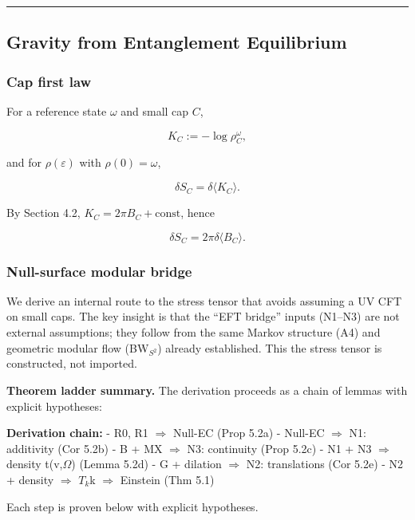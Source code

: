 \documentclass[11pt,a4paper]{article}
\theoremstyle{remark}
\begin{document}
\begin{center}\rule{0.5\linewidth}{0.5pt}\end{center}

\subsection{Gravity from Entanglement Equilibrium}\label{gravity-from-entanglement-equilibrium}

\subsubsection{Cap first law}\label{cap-first-law}

For a reference state \(\omega\) and small cap \(C\),

\[
K_C := -\log \rho_C^{\omega},
\]

and for \(\rho(\varepsilon)\) with \(\rho(0)=\omega\),

\[
\delta S_C = \delta \langle K_C \rangle.
\]

By Section 4.2, \(K_C = 2\pi B_C + \text{const}\), hence

\[
\delta S_C = 2 \pi \delta \langle B_C \rangle.
\]

\subsubsection{Null-surface modular bridge}\label{null-surface-modular-bridge}

We derive an internal route to the stress tensor that avoids assuming a UV
CFT on small caps. The key insight is that the ``EFT bridge'' inputs (N1--N3)
are not external assumptions; they follow from the same Markov structure
(A4) and geometric modular flow (BW\(_{S^2}\)) already established. This
the stress tensor is constructed, not imported.

\textbf{Theorem ladder summary.} The derivation proceeds as a chain of lemmas with
explicit hypotheses:

\textbf{Derivation chain:}
- R0, R1 \ensuremath{\Longrightarrow} Null-EC (Prop 5.2a)
- Null-EC \ensuremath{\Longrightarrow} N1: additivity (Cor 5.2b)
- B + MX \ensuremath{\Longrightarrow} N3: continuity (Prop 5.2c)
- N1 + N3 \ensuremath{\Longrightarrow} density t(v,\ensuremath{\Omega}) (Lemma 5.2d)
- G + dilation \ensuremath{\Longrightarrow} N2: translations (Cor 5.2e)
- N2 + density \ensuremath{\Longrightarrow} \(T_k\)k \ensuremath{\Longrightarrow} Einstein (Thm 5.1)

Each step is proven below with explicit hypotheses.
\end{document}

